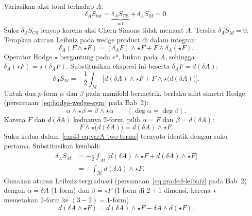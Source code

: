 Variasikan aksi total terhadap $A$:
\begin{equation}\label{em43-eq:varA-total}
    \delta_{A} S_{\mathrm{tot}}
    = \underbrace{\delta_{A} S_{\mathrm{CS}}}_{= 0}
    + \delta_{A} S_{M} = 0.
\end{equation}
Suku $\delta_{A} S_{\mathrm{CS}}$ lenyap karena aksi Chern-Simons tidak memuat $A$. Tersisa $\delta_{A} S_{M} = 0$.
Terapkan aturan Leibniz pada wedge product di dalam integran:
\begin{equation}\label{em43-eq:varA-leibniz}
    \delta_{A}(F \wedge \star F)
    = (\delta_{A} F) \wedge \star F + F \wedge \delta_{A}(\star F).
\end{equation}
Operator Hodge $\star$ bergantung pada $e^{a}$, bukan pada $A$, sehingga $\delta_{A}(\star F) = \star(\delta_{A} F)$. Substitusikan ekspresi ini beserta $\delta_{A} F = d(\delta A)$:
\begin{equation}\label{em43-eq:varA-two-terms}
    \delta_{A} S_{M}
    = -\frac{1}{2} \int_{\mathcal{M}}
    \Big[d(\delta A) \wedge \star F
    + F \wedge \star\!\big(d(\delta A)\big)\Big].
\end{equation}
Untuk dua $p$-form $\alpha$ dan $\beta$ pada manifold bermetrik, berlaku sifat simetri Hodge (persamaan~\eqref{eq:hodge-wedge-sym} pada Bab~2):
\begin{equation}\label{em43-eq:hodge-sym}
    \alpha \wedge \star\beta = \beta \wedge \star\alpha
    \qquad (\deg\alpha = \deg\beta).
\end{equation}
Karena $F$ dan $d(\delta A)$ keduanya 2-form, pilih $\alpha = F$ dan $\beta = d(\delta A)$:
\begin{equation}
    F \wedge \star\!\big(d(\delta A)\big)
    = d(\delta A) \wedge \star F.
\end{equation}
Suku kedua dalam~\eqref{em43-eq:varA-two-terms} ternyata identik dengan suku pertama. Substitusikan kembali:
\begin{align}
    \delta_{A} S_{M}
    &= -\frac{1}{2} \int_{\mathcal{M}}
    \Big[d(\delta A) \wedge \star F
    + d(\delta A) \wedge \star F\Big] \nonumber \\
    &= -\int_{\mathcal{M}} d(\delta A) \wedge \star F.
    \label{em43-eq:varA-combined}
\end{align}
Gunakan aturan Leibniz tergraduasi (persamaan~\eqref{eq:graded-leibniz} pada Bab~2) dengan $\alpha = \delta A$ (1-form) dan $\beta = \star F$ (1-form di $2+1$ dimensi, karena $\star$ memetakan 2-form ke $(3-2) = 1$-form):
\begin{equation}
    d(\delta A \wedge \star F)
    = d(\delta A) \wedge \star F
    - \delta A \wedge d(\star F).
\end{equation}
